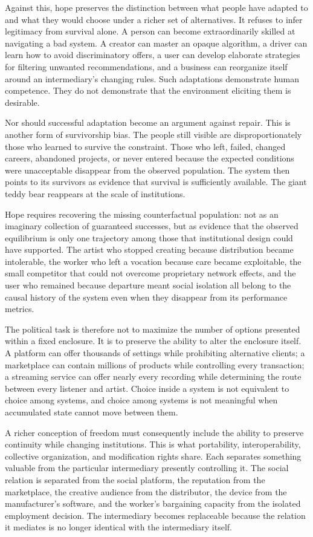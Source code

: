 \documentclass[11pt]{article}
\begin{document}
Against this, hope preserves the distinction between what people have adapted to and what they would choose under a richer set of alternatives. It refuses to infer legitimacy from survival alone. A person can become extraordinarily skilled at navigating a bad system. A creator can master an opaque algorithm, a driver can learn how to avoid discriminatory offers, a user can develop elaborate strategies for filtering unwanted recommendations, and a business can reorganize itself around an intermediary's changing rules. Such adaptations demonstrate human competence. They do not demonstrate that the environment eliciting them is desirable.

Nor should successful adaptation become an argument against repair. This is another form of survivorship bias. The people still visible are disproportionately those who learned to survive the constraint. Those who left, failed, changed careers, abandoned projects, or never entered because the expected conditions were unacceptable disappear from the observed population. The system then points to its survivors as evidence that survival is sufficiently available. The giant teddy bear reappears at the scale of institutions.

Hope requires recovering the missing counterfactual population: not as an imaginary collection of guaranteed successes, but as evidence that the observed equilibrium is only one trajectory among those that institutional design could have supported. The artist who stopped creating because distribution became intolerable, the worker who left a vocation because care became exploitable, the small competitor that could not overcome proprietary network effects, and the user who remained because departure meant social isolation all belong to the causal history of the system even when they disappear from its performance metrics.

The political task is therefore not to maximize the number of options presented within a fixed enclosure. It is to preserve the ability to alter the enclosure itself. A platform can offer thousands of settings while prohibiting alternative clients; a marketplace can contain millions of products while controlling every transaction; a streaming service can offer nearly every recording while determining the route between every listener and artist. Choice inside a system is not equivalent to choice among systems, and choice among systems is not meaningful when accumulated state cannot move between them.

A richer conception of freedom must consequently include the ability to preserve continuity while changing institutions. This is what portability, interoperability, collective organization, and modification rights share. Each separates something valuable from the particular intermediary presently controlling it. The social relation is separated from the social platform, the reputation from the marketplace, the creative audience from the distributor, the device from the manufacturer's software, and the worker's bargaining capacity from the isolated employment decision. The intermediary becomes replaceable because the relation it mediates is no longer identical with the intermediary itself.
\end{document}
